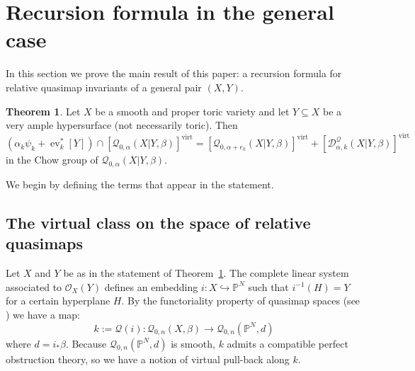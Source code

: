 \documentclass[11pt]{amsart}
\newcommand{\Q}[4]{\mathcal{Q}_{#1,#2}(#3,#4)}
\newcommand{\PP}{\mathbb P}
\newcommand{\OO}{\mathcal{O}}
\renewcommand{\to}{\rightarrow}
\newcommand{\virt}[1]{[#1]^{\operatorname{virt}}}
\newcommand{\ev}{\operatorname{ev}}
\newcommand{\om}[1]{\mathcal{#1}}
\theoremstyle{definition}
\newtheorem{thm}{Theorem}[section]
\theoremstyle{definition}
\begin{document}
\section{Recursion formula in the general case}\label{Section recursion formula in general case}

In this section we prove the main result of this paper: a recursion formula for relative quasimap invariants of a general pair $(X,Y)$.  

\begin{thm} \label{Theorem general recursion} Let $X$ be a smooth and proper toric variety and let $Y \subseteq X$ be a very ample hypersurface (not necessarily toric). Then
\begin{equation*} (\alpha_k \psi_k + \ev_k^* [Y]) \cap \virt{\Q{0}{\alpha}{X|Y}{\beta}} = \virt{\Q{0}{\alpha+e_k}{X|Y}{\beta}} + \virt{\mathcal D^\mathcal{Q}_{\alpha,k}(X|Y,\beta)} \end{equation*}
in the Chow group of $\Q{0}{\alpha}{X|Y}{\beta}$. 
\end{thm}

\noindent We begin by defining the terms that appear in the statement.

\subsection{The virtual class on the space of relative quasimaps}\label{Subsection virtual class in general} Let $X$ and $Y$ be as in the statement of Theorem~\ref{Theorem general recursion}.  The complete linear system associated to $\OO_X(Y)$ defines an embedding $i : X \hookrightarrow \PP^N$ such that $i^{-1}(H) = Y$ for a certain hyperplane $H$. By the functoriality property of quasimap spaces (see \cite[\S 3.1]{CF-K-wallcrossing}) we have a map:
\begin{equation*} k := \om{Q}(i) : \Q{0}{n}{X}{\beta} \to \Q{0}{n}{\PP^N}{d} \end{equation*}
where $d=i_*\beta$. Because $\Q{0}{n}{\PP^N}{d}$ is smooth, $k$ admits a compatible perfect obstruction theory, so we have a notion of virtual pull-back along $k$.
\end{document}

